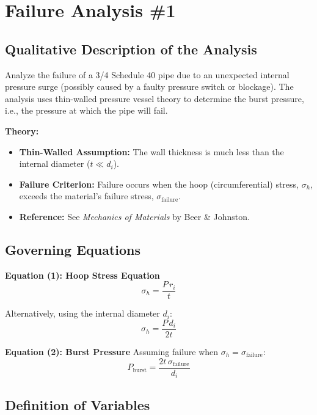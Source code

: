 \documentclass[12pt]{report}
\begin{document}
\newpage
\section{Failure Analysis \#1}

\subsection{Qualitative Description of the Analysis}
Analyze the failure of a 3/4 Schedule 40 pipe due to an unexpected internal pressure surge (possibly caused by a faulty pressure switch or blockage). The analysis uses thin-walled pressure vessel theory to determine the burst pressure, i.e., the pressure at which the pipe will fail.

\noindent
\textbf{Theory:}
\begin{itemize}
    \item \textbf{Thin-Walled Assumption:} The wall thickness is much less than the internal diameter ($t \ll d_i$).
    \item \textbf{Failure Criterion:} Failure occurs when the hoop (circumferential) stress, $\sigma_h$, exceeds the material's failure stress, $\sigma_{\text{failure}}$.
    \item \textbf{Reference:} See \emph{Mechanics of Materials} by Beer \& Johnston.
\end{itemize}

\subsection{Governing Equations}
\textbf{Equation (1): Hoop Stress Equation}
\begin{equation}
    \sigma_h = \frac{P \, r_i}{t}
    \tag{1}
\end{equation}

Alternatively, using the internal diameter $d_i$:
\begin{equation}
    \sigma_h = \frac{P \, d_i}{2t}
    \tag{1a}
\end{equation}

\noindent\textbf{Equation (2): Burst Pressure}
Assuming failure when $\sigma_h = \sigma_{\text{failure}}$:
\begin{equation}
    P_{\text{burst}} = \frac{2t\, \sigma_{\text{failure}}}{d_i}
    \tag{2}
\end{equation}

\subsection{Definition of Variables}
\end{document}
